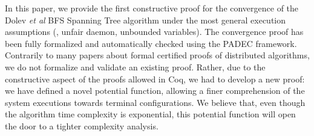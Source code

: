 In this paper, we provide the first constructive proof for the
convergence of the Dolev \emph{et al} BFS Spanning Tree algorithm
under the most general execution assumptions (\ie, unfair daemon,
unbounded variables).
The convergence proof has been fully formalized and automatically
checked using the PADEC framework.
Contrarily to many papers about formal certified proofs of distributed
algorithms, we do not formalize and validate an existing
proof. Rather, due to the constructive aspect of the proofs allowed in
Coq, we had to develop a new proof: we have defined a novel potential
function, allowing a finer comprehension of the system executions
towards terminal configurations.
We believe that, even though the algorithm time complexity is
exponential, this potential function will open the door to a tighter
complexity analysis.
